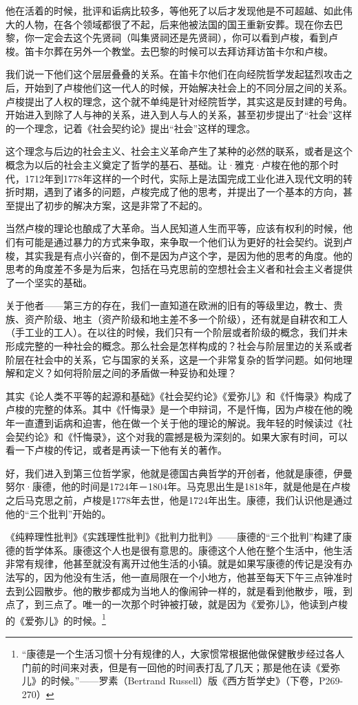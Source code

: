 \documentclass[UTF8, 12pt, a4paper]{ctexrep}
\begin{document}
他在活着的时候，批评和诟病比较多，等他死了以后才发现他是不可超越、如此伟大的人物，在各个领域都很了不起，后来他被法国的国王重新安葬。现在你去巴黎，你一定会去这个先贤祠（叫集贤祠还是先贤祠），你可以看到卢梭，看到卢梭。笛卡尔葬在另外一个教堂。去巴黎的时候可以去拜访拜访笛卡尔和卢梭。

我们说一下他们这个层层叠叠的关系。在笛卡尔他们在向经院哲学发起猛烈攻击之后，开始到了卢梭他们这一代人的时候，开始解决社会上的不同分层之间的关系。卢梭提出了人权的理念，这个就不单纯是针对经院哲学，其实这是反封建的号角。开始进入到除了人与神的关系，进入到人与人的关系，甚至初步提出了“社会”这样的一个理念，记着《社会契约论》提出“社会”这样的理念。

这个理念与后边的社会主义、社会主义革命产生了某种的必然的联系，或者是这个概念为以后的社会主义奠定了哲学的基石、基础。让·雅克·卢梭在他的那个时代，1712年到1778年这样的一个时代，实际上是法国完成工业化进入现代文明的转折时期，遇到了诸多的问题，卢梭完成了他的思考，并提出了一个基本的方向，甚至提出了初步的解决方案，这是非常了不起的。

当然卢梭的理论也酿成了大革命。当人民知道人生而平等，应该有权利的时候，他们有可能是通过暴力的方式来争取，来争取一个他们认为更好的社会契约。说到卢梭，其实我是有点小兴奋的，倒不是因为卢这个字，是因为他的思考的角度。他的思考的角度差不多是为后来，包括在马克思前的空想社会主义者和社会主义者提供了一个坚实的基础。

关于他者——第三方的存在，我们一直知道在欧洲的旧有的等级里边，教士、贵族、资产阶级、地主（资产阶级和地主差不多一个阶级），还有就是自耕农和工人（手工业的工人）。在以往的时候，我们只有一个阶层或者阶级的概念，我们并未形成完整的一种社会的概念。那么社会是怎样构成的？社会与阶层里边的关系或者阶层在社会中的关系，它与国家的关系，这是一个非常复杂的哲学问题。如何地理解和定义？如何将阶层之间的矛盾做一种妥协和处理？

其实《论人类不平等的起源和基础》《社会契约论》《爱弥儿》和《忏悔录》构成了卢梭的完整的体系。其中《忏悔录》是一个申辩词，不是忏悔，因为卢梭在他的晚年一直遭到诟病和迫害，他在做一个关于他的理论的解说。我年轻的时候读过《社会契约论》和《忏悔录》，这个对我的震撼是极为深刻的。如果大家有时间，可以看一下卢梭的传记，或者是再读一下他有关的著作。

好，我们进入到第三位哲学家，他就是德国古典哲学的开创者，他就是康德，伊曼努尔·康德，他的时间是1724年－1804年。马克思出生是1818年，就是他是在卢梭之后马克思之前，卢梭是1778年去世，他是1724年出生。康德，我们认识他是通过他的“三个批判”开始的。

《纯粹理性批判》《实践理性批判》《批判力批判》——康德的“三个批判”构建了康德的哲学体系。康德这个人也是很有意思的。康德这个人他在整个生活中，他生活非常有规律，他甚至就没有离开过他生活的小镇。就是如果写康德的传记是没有办法写的，因为他没有生活，他一直局限在一个小地方，他甚至每天下午三点钟准时去到公园散步。他的散步都成为当地人的像闹钟一样的，就是看到他散步，哦，到点了，到三点了。唯一的一次那个时钟被打破，就是因为《爱弥儿》，他读到卢梭的《爱弥儿》的时候。\footnote{“康德是一个生活习惯十分有规律的人，大家惯常根据他做保健散步经过各人门前的时间来对表，但是有一回他的时间表打乱了几天；那是他在读《爱弥儿》的时候。”——罗素（Bertrand Russell）版《西方哲学史》（下卷，P269-270）}
\end{document}
